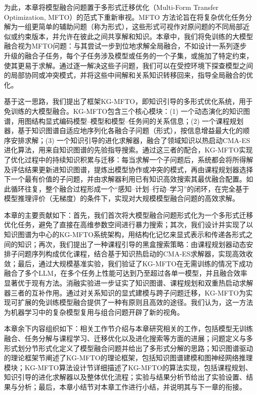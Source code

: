 \documentclass[../main.tex]{subfiles}
\begin{document}
为此，本章将模型融合问题置于多形式迁移优化（Multi-Form Transfer Optimization, MFTO）的范式下重新审视\cite{evolutionarytransferoptimization_tan_2021}。MFTO 方法论旨在将复杂优化任务分解为一组更简单的辅助问题（称为形式），这些形式可视作对原问题的不同局部近似或约束版本，并允许在彼此之间共享解和知识。本章中，我们将免训练的大模型融合视为MFTO问题：与其尝试一步到位地求解全局融合，不如设计一系列逐步升级的融合子任务，每个子任务涉及模型或任务的一个子集，或施加了特定约束，使其更易于求解。通过逐一解决这些子问题，我们可以在受控环境下探查模型之间的局部协同或冲突模式，并将这些中间解和关系知识转移回来，指导全局融合的优化。

基于这一思路，我们提出了框架KG-MFTO，即知识引导的多形式优化系统，用于免训练的大模型融合。KG-MFTO包含三个核心模块：(1) 一个动态演化的知识图谱，用图结构显式编码模型–模型和模型–任务间的关系信息；(2) 一个课程规划器，基于知识图谱自适应地序列化各融合子问题（形式），按信息增益最大化的顺序安排求解；(3) 一个知识引导的进化求解器，融合了领域知识以热启动CMA-ES进化算法，用来自知识图谱的先验指导搜索。通过这三者的配合，KG-MFTO实现了优化过程中的持续知识积累与迁移：每当求解一个子问题后，系统都会将所得解及评估结果更新进知识图谱，提炼出模型协作或冲突的模式，再由课程规划器选择下一个最有价值的子问题，并由求解器利用已有知识高效搜索其最优融合配置。如此循环往复，整个融合过程形成一个“感知–计划–行动–学习”的闭环，在完全基于模型推理评价（无梯度）的条件下，实现对大规模模型融合问题的高效求解。

本章的主要贡献如下：首先，我们首次将大模型融合问题形式化为一个多形式迁移优化任务，避免了直接在高维参数空间进行暴力搜索；其次，我们设计并实现了以知识图谱为中心的KG-MFTO系统架构，用结构化记忆来显式表示和传递各形式之间的知识；再次，我们提出了一种课程引导的黑盒搜索策略：由课程规划器动态安排子问题序列构成优化课程，结合基于知识热启动的CMA-ES求解器，实现高效收敛；最后，通过大规模基准实验，我们验证了KG-MFTO在无需训练的情况下成功融合了多个LLM，在多个任务上性能可达到乃至超过各单一模型，并且融合效率显著优于现有方法。消融实验进一步证实了知识图谱、课程规划和双重热启动求解器三者的互补作用。通过对关系知识的显式建模与跨子问题迁移，KG-MFTO为实现可扩展的免训练模型融合提供了一种有原则且高效的途径。我们认为，这一方法为机器学习中的复杂模型复用与组合问题开辟了新的视角。

本章余下内容组织如下：相关工作节介绍与本章研究相关的工作，包括模型无训练融合、任务分解与课程学习、迁移优化以及进化搜索等方面的进展；问题定义与多形式划分节形式化定义了模型融合问题并给出了多形式分解的思路；知识图谱驱动的理论框架节阐述了KG-MFTO的理论框架，包括知识图谱建模和图神经网络推理模块；KG-MFTO算法设计节详细描述了KG-MFTO的算法实现，包括课程规划、知识引导的进化求解器以及整体优化流程；实验与结果分析节给出了实验设置、结果与分析；最后，本章小结节对本章工作进行小结，并说明其与下一章的衔接。
\end{document}
